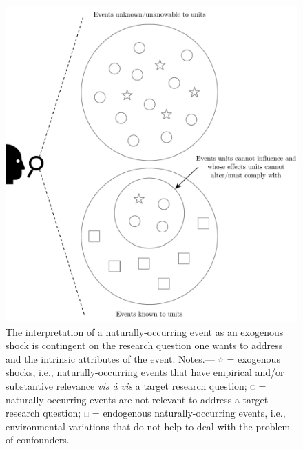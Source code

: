 \documentclass[11pt]{article}
\begin{document}
\begin{refsection}
\begin{figure}[!htbp]
  \centering
  \includegraphics[width=1\textwidth]{exhibits/exogenous_shocks_and_ne.pdf}
  \caption{The interpretation of a naturally-occurring event as an exogenous 
  shock is contingent on the research question one wants to address and the 
  intrinsic attributes of the event. 
  Notes.---  
  \includegraphics[width=0.02\textwidth]{exhibits/exogenous_shocks_and_ne_0.pdf}
  = exogenous shocks, i.e., naturally-occurring events that have empirical and/or 
  substantive relevance \textit{vis \'{a} vis} a target research question;
  \includegraphics[width=0.0175\textwidth]{exhibits/exogenous_shocks_and_ne_2.pdf}
  = naturally-occurring events are not relevant to address a target research 
  question;
  \includegraphics[width=0.0175\textwidth]{exhibits/exogenous_shocks_and_ne_1.pdf}
  = endogenous naturally-occurring events, i.e., environmental variations that 
  do not help to deal with the problem of confounders.}
  \label{fig:exogeneous_shocks_and_ne}
\end{figure}


\end{refsection}
\end{document}

